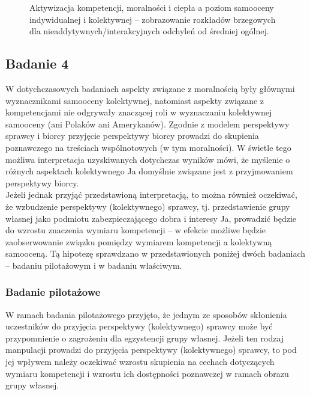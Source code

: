 \documentclass[man]{apa6}
\begin{document}
\begin{figure*}[htbp]
   \centering
   \caption{Aktywizacja kompetencji, moralności i ciepła a poziom samooceny indywidualnej i kolektywnej -- zobrazowanie rozkładów brzegowych dla nieaddytywnych/interakcyjnych odchyleń od średniej ogólnej.}
   \label{fig:study3}
\end{figure*}



\newpage
\subsection{Badanie 4}

W dotychczasowych badaniach aspekty związane z moralnością były głównymi wyznacznikami samooceny kolektywnej, natomiast aspekty związane z kompetencjami nie odgrywały znaczącej roli w wyznaczaniu kolektywnej samooceny (ani Polaków ani Amerykanów). Zgodnie z modelem perspektywy sprawcy i biorcy \parencite{abele2014communal} przyjęcie perspektywy biorcy prowadzi do skupienia poznawczego na treściach wspólnotowych (w tym moralności). W świetle tego możliwa interpretacja uzyskiwanych dotychczas wyników mówi, że myślenie o różnych aspektach kolektywnego Ja domyślnie związane jest z przyjmowaniem perspektywy biorcy.\\

Jeżeli jednak przyjąć przedstawioną interpretacją, to można również oczekiwać, że wzbudzenie perspektywy (kolektywnego) sprawcy, tj. przedstawienie grupy własnej jako podmiotu zabezpieczającego dobra i interesy Ja, prowadzić będzie do wzrostu znaczenia wymiaru kompetencji -- w efekcie możliwe będzie zaobserwowanie związku pomiędzy wymiarem kompetencji a kolektywną samooceną. Tą hipotezę sprawdzano w przedstawionych poniżej dwóch badaniach -- badaniu pilotażowym i w badaniu właściwym.\\

\subsubsection{Badanie pilotażowe}
W ramach badania pilotażowego przyjęto, że jednym ze sposobów skłonienia uczestników do przyjęcia perspektywy (kolektywnego) sprawcy może być przypomnienie o zagrożeniu dla egzystencji grupy własnej. Jeżeli ten rodzaj manpulacji prowadzi do przyjęcia perspektywy (kolektywnego) sprawcy, to pod jej wpływem należy oczekiwać wzrostu skupienia na cechach dotyczących wymiaru kompetencji i wzrostu ich dostępności poznawczej w ramach obrazu grupy własnej.
\end{document}
